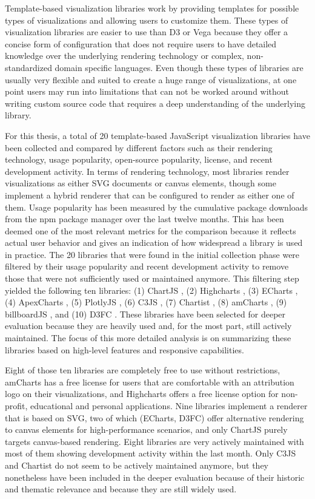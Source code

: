 Template-based visualization libraries work by providing templates for possible types of visualizations and allowing users to customize them. 
These types of visualization libraries are easier to use than D3 or Vega because they offer a concise form of configuration that does not require users to have detailed knowledge over the underlying rendering technology or complex, non-standardized domain specific languages. 
Even though these types of libraries are usually very flexible and suited to create a huge range of visualizations, at one point users may run into limitations that can not be worked around without writing custom source code that requires a deep understanding of the underlying library. 

For this thesis, a total of 20 template-based JavaScript visualization libraries have been collected and compared by different factors such as their rendering technology, usage popularity, open-source popularity, license, and recent development activity. 
In terms of rendering technology, most libraries render visualizations as either SVG documents or canvas elements, though some implement a hybrid renderer that can be configured to render as either one of them. 
Usage popularity has been measured by the cumulative package downloads from the npm package manager over the last twelve months. 
This has been deemed one of the most relevant metrics for the comparison because it reflects actual user behavior and gives an indication of how widespread a library is used in practice. 
The 20 libraries that were found in the initial collection phase were filtered by their usage popularity and recent development activity to remove those that were not sufficiently used or maintained anymore. 
This filtering step yielded the following ten libraries: (1) ChartJS \parencite{ChartJS}, (2) Highcharts \parencite{Highcharts}, (3) ECharts \parencite{ECharts}, (4) ApexCharts \parencite{ApexCharts}, (5) PlotlyJS \parencite{PlotlyJS}, (6) C3JS \parencite{C3JS}, (7) Chartist \parencite{Chartist}, (8) amCharts \parencite{amCharts}, (9) billboardJS \parencite{billboardJS}, and (10) D3FC \parencite{D3FC}. 
These libraries have been selected for deeper evaluation because they are heavily used and, for the most part, still actively maintained. 
The focus of this more detailed analysis is on summarizing these libraries based on high-level features and responsive capabilities.

Eight of those ten libraries are completely free to use without restrictions, amCharts has a free license for users that are comfortable with an attribution logo on their visualizations, and Highcharts offers a free license option for non-profit, educational and personal applications.
Nine libraries implement a renderer that is based on SVG, two of which (ECharts, D3FC) offer alternative rendering to canvas elements for high-performance scenarios, and only ChartJS purely targets canvas-based rendering. 
Eight libraries are very actively maintained with most of them showing development activity within the last month. 
Only C3JS and Chartist do not seem to be actively maintained anymore, but they nonetheless have been included in the deeper evaluation because of their historic and thematic relevance and because they are still widely used. 

